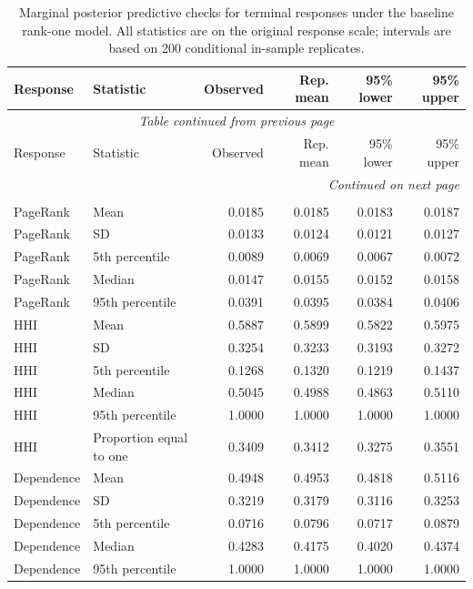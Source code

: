\documentclass[pdftex,12pt,openright,a4paper,oneside]{book}
\begin{document}
\begingroup
\small
\setlength{\LTleft}{0pt}
\setlength{\LTright}{0pt}
\begin{longtable}{llrrrr}
\caption{Marginal posterior predictive checks for terminal responses under the baseline rank-one model. All statistics are on the original response scale; intervals are based on 200 conditional in-sample replicates.}
\label{tab:terminal_marginal_ppc_full}\\
\toprule
Response & Statistic & Observed & Rep. mean & 95\% lower & 95\% upper \\
\midrule
\endfirsthead
\multicolumn{6}{c}{\textit{Table continued from previous page}}\\
\toprule
Response & Statistic & Observed & Rep. mean & 95\% lower & 95\% upper \\
\midrule
\endhead
\midrule
\multicolumn{6}{r}{\textit{Continued on next page}}\\
\endfoot
\bottomrule
\endlastfoot
\multicolumn{6}{l}{\textit{All terminals}}\\
\midrule
PageRank & Mean & 0.0185 & 0.0185 & 0.0183 & 0.0187 \\
PageRank & SD & 0.0133 & 0.0124 & 0.0121 & 0.0127 \\
PageRank & 5th percentile & 0.0089 & 0.0069 & 0.0067 & 0.0072 \\
PageRank & Median & 0.0147 & 0.0155 & 0.0152 & 0.0158 \\
PageRank & 95th percentile & 0.0391 & 0.0395 & 0.0384 & 0.0406 \\
\addlinespace[2pt]
HHI & Mean & 0.5887 & 0.5899 & 0.5822 & 0.5975 \\
HHI & SD & 0.3254 & 0.3233 & 0.3193 & 0.3272 \\
HHI & 5th percentile & 0.1268 & 0.1320 & 0.1219 & 0.1437 \\
HHI & Median & 0.5045 & 0.4988 & 0.4863 & 0.5110 \\
HHI & 95th percentile & 1.0000 & 1.0000 & 1.0000 & 1.0000 \\
HHI & Proportion equal to one & 0.3409 & 0.3412 & 0.3275 & 0.3551 \\
\addlinespace[2pt]
Dependence & Mean & 0.4948 & 0.4953 & 0.4818 & 0.5116 \\
Dependence & SD & 0.3219 & 0.3179 & 0.3116 & 0.3253 \\
Dependence & 5th percentile & 0.0716 & 0.0796 & 0.0717 & 0.0879 \\
Dependence & Median & 0.4283 & 0.4175 & 0.4020 & 0.4374 \\
Dependence & 95th percentile & 1.0000 & 1.0000 & 1.0000 & 1.0000 \\

\end{longtable}
\end{document}
